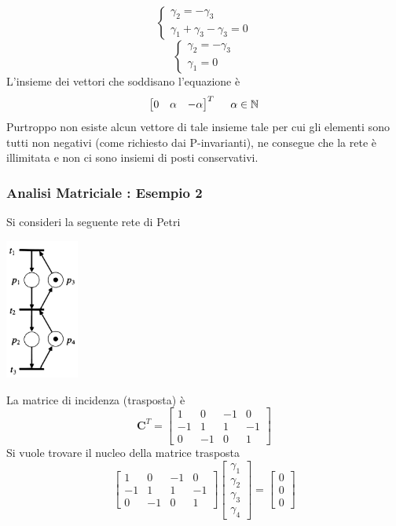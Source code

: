 \documentclass[10pt, letterpaper]{report}
\begin{document}
$$ 
\begin{cases}
    \gamma_2=-\gamma_3\\ 
    \gamma_1+\gamma_3-\gamma_3=0
\end{cases}
$$
$$ 
\begin{cases}
    \gamma_2=-\gamma_3\\ 
    \gamma_1=0
\end{cases}
$$
L'insieme dei vettori che soddisano l'equazione è 
$$ \begin{bmatrix}
    0 & \alpha & -\alpha
\end{bmatrix}^T \ \ \ \ \alpha\in {\mathbb N}$$
Purtroppo non esiste alcun vettore di tale insieme tale per cui gli elementi sono tutti non negativi (come richiesto dai P-invarianti), ne consegue che la rete è illimitata e non ci sono insiemi di posti conservativi. 
\subsubsection{Analisi Matriciale : Esempio 2} 
Si consideri la seguente rete di Petri
\begin{center}
    \includegraphics[width=0.18\textwidth]{images/petriMatrix2.pdf}
\end{center}
La matrice di incidenza (trasposta) è 
$$ \mathbf C^T = 
\begin{bmatrix}
    1 & 0& -1 & 0 \\ 
    -1 & 1 & 1 &-1\\ 
    0 & -1 & 0 & 1
\end{bmatrix}
$$
Si vuole trovare il nucleo della matrice trasposta$$
\begin{bmatrix}
    1 & 0& -1 & 0 \\ 
    -1 & 1 & 1 &-1\\ 
    0 & -1 & 0 & 1
\end{bmatrix}\begin{bmatrix}
    \gamma_1\\\gamma_2\\ \gamma_3\\ \gamma_4
\end{bmatrix}=\begin{bmatrix}
    0 \\ 0 \\ 0 
\end{bmatrix}$$
\end{document}
